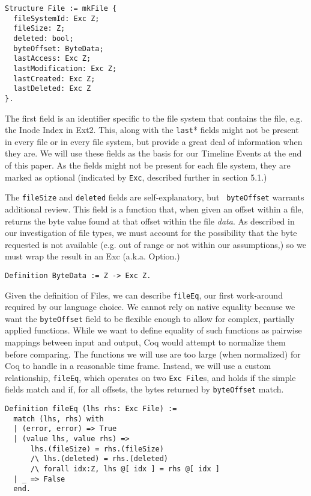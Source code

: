 \documentclass[nocopyrightspace]{sigplanconf}
\begin{document}
\begin{lstlisting}
Structure File := mkFile {
  fileSystemId: Exc Z;
  fileSize: Z;
  deleted: bool;
  byteOffset: ByteData;
  lastAccess: Exc Z;
  lastModification: Exc Z;
  lastCreated: Exc Z;
  lastDeleted: Exc Z
}.
\end{lstlisting}

The first field is an identifier specific to the file system that contains
the file, e.g. the Inode Index in Ext2. This, along with the {\tt last}*
fields might not be present in every file or in every file system, but provide
a great deal of information when they are. We will use these fields as the
basis for our Timeline Events at the end of this paper. As the fields might
not be present for each file system, they are marked as optional (indicated by
{\tt Exc}, described further in section 5.1.)

The {\tt fileSize} and {\tt deleted} fields are self-explanatory, but {\tt
byteOffset} warrants additional review. This field is a function that, when
given an offset within a file, returns the byte value found at that offset
within the file {\em data}. As described in our investigation of file types,
we must account for the possibility that the byte requested is not available
(e.g. out of range or not within our assumptions,) so we must wrap the result
in an Exc (a.k.a. Option.)

\begin{lstlisting}
Definition ByteData := Z -> Exc Z.
\end{lstlisting}

Given the definition of Files, we can describe {\tt fileEq}, our first
work-around required by our language choice. We cannot rely on native equality
because we want the {\tt byteOffset} field to be flexible enough to allow for
complex, partially applied functions. While we want to define equality of such
functions as pairwise mappings between input and output, Coq would attempt to
normalize them before comparing. The functions we will use are too large (when
normalized) for Coq to handle in a reasonable time frame. Instead, we will use
a custom relationship, {\tt fileEq}, which operates on two {\tt Exc File}s,
and holds if the simple fields match and if, for all offsets, the bytes
returned by {\tt byteOffset} match.

\begin{lstlisting}
Definition fileEq (lhs rhs: Exc File) :=
  match (lhs, rhs) with
  | (error, error) => True
  | (value lhs, value rhs) =>
      lhs.(fileSize) = rhs.(fileSize)
      /\ lhs.(deleted) = rhs.(deleted)
      /\ forall idx:Z, lhs @[ idx ] = rhs @[ idx ]
  | _ => False
  end.
\end{lstlisting}
\end{document}
